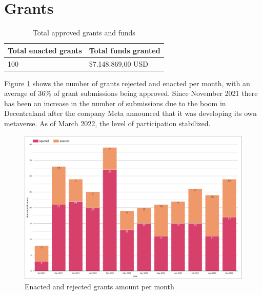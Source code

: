 \documentclass[MSE,Master,english]{twbook}%
\begin{document}
\section{Grants}
\begin{center}
  \begin{table}[H]
    \begin{tabular}{ | m{20em} | m{20em} | }
      \hline
      \textbf{Total enacted grants} & \textbf{Total funds granted} \\
      \hline
      100 & \$7.148.869,00 USD \\
      \hline
    \end{tabular}
    \caption{Total approved grants and funds}
    \label{table:grants_info}
  \end{table}
\end{center}

Figure \ref{fig:grants_amount} shows the number of grants rejected and enacted per month, with an average of 36\% of grant submissions being approved. Since November 2021 there has been an increase in the number of submissions due to the boom in Decentraland after the company Meta announced that it was developing its own metaverse. As of March 2022, the level of participation stabilized.
\begin{figure}[H]
  \centering
  \includegraphics[width=\textwidth]{metrics/grants_amount.png}
  \caption{Enacted and rejected grants amount per month}
  \label{fig:grants_amount}
\end{figure}
\end{document}
